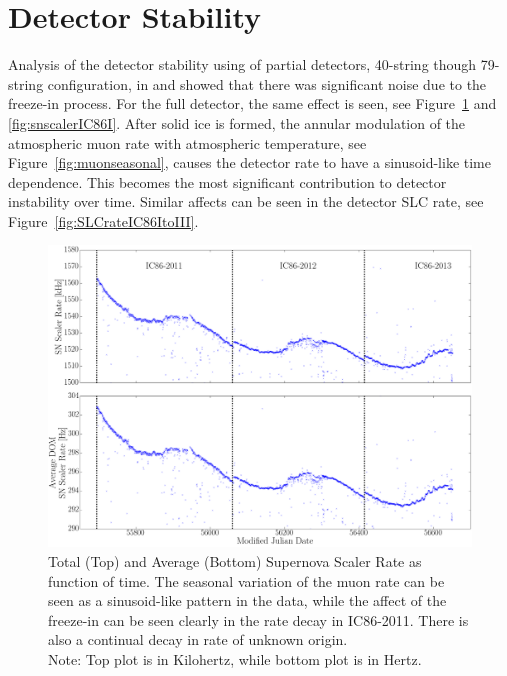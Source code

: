 \section{Detector Stability}

Analysis of the detector stability using of partial detectors, 40-string though 79-string configuration, in \cite{vbaumaster} and \cite{mkrasbergtalk} showed that there was significant noise due to the freeze-in process. For the full detector, the same effect is seen, see Figure~\ref{fig:snscalerIC86ItoIII} and \ref{fig:snscalerIC86I}. After solid ice is formed, the annular modulation of the atmospheric muon rate with atmospheric temperature, see Figure~\ref{fig:muonseasonal}, causes the detector rate to have a sinusoid-like time dependence. This becomes the most significant contribution to detector instability over time. Similar affects can be seen in the detector SLC rate, see Figure~\ref{fig:SLCrateIC86ItoIII}. 

\begin{figure}[h]
  \begin{center}
    \includegraphics[width=1\textwidth]{./figures/SNScalerRateTotalAvgIC86I_III.png} 
  \end{center}
  \caption{ Total (Top) and Average (Bottom) Supernova Scaler Rate as function of time. The seasonal variation of the muon rate can be seen as a sinusoid-like pattern in the data, while the affect of the freeze-in can be seen clearly in the rate decay in IC86-2011. There is also a continual decay in rate of unknown origin.\\
  Note: Top plot is in Kilohertz, while bottom plot is in Hertz.\label{fig:snscalerIC86ItoIII}}   
\end{figure}

